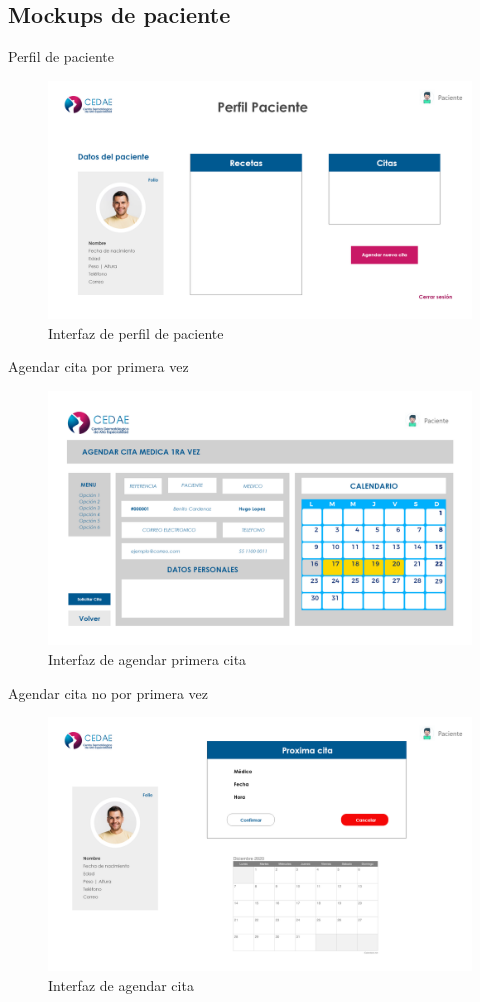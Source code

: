 \documentclass[12pt,letterpaper]{article}
\begin{document}
        \subsection{Mockups de paciente}
        Perfil de paciente
            \begin{figure}[H]
                \centering
                \includegraphics [scale=0.19]{pac_perfil}
                \caption{Interfaz de perfil de paciente}
            \end{figure}
        Agendar cita por primera vez
            \begin{figure}[H]
                \centering
                \includegraphics [scale=0.18]{pac_cita_primera}
                \caption{Interfaz de agendar primera cita}
            \end{figure}
        Agendar cita no por primera vez
            \begin{figure}[H]
                \centering
                \includegraphics [scale=0.18]{pac_cita_no_primera}
                \caption{Interfaz de agendar cita}
            \end{figure}
\end{document}
